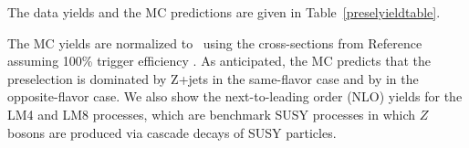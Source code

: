 

The data yields and the MC predictions are given in Table~\ref{preselyieldtable}.

The MC yields are normalized to \lumi\ using the cross-sections
from Reference~\cite{ref:xsec} assuming 100\% trigger efficiency 
.
As anticipated, the MC predicts that the preselection is dominated by Z+jets in the same-flavor 
case and by \ttbar in the opposite-flavor case.  
We also show the %
next-to-leading order (NLO) %
yields for the LM4 and LM8 processes, which are benchmark
SUSY processes in which $Z$ bosons are produced via cascade decays of SUSY particles. 




